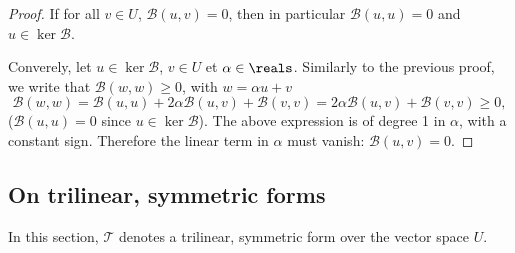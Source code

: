 \begin{proof}
  If for all $v \in U$, $\mathcal{B}(u, v) = 0$, then in particular $\mathcal{B}(u, u) = 0$ and
  $u \in \ker \mathcal{B}$.

  Converely, let $u \in \ker \mathcal{B}$, $v \in U$ et $\alpha \in \reals$. Similarly to the previous proof, we write
  that $\mathcal{B}(w, w) \geq 0$, with $w = \alpha u + v$
  \begin{equation*}
    \mathcal{B}(w, w) = \mathcal{B}(u, u) + 2 \alpha \mathcal{B}(u, v) +\mathcal{B}(v, v) = 2 \alpha \mathcal{B}(u, v) +\mathcal{B}(v, v) \geq 0,
  \end{equation*}
  ($\mathcal{B}(u, u) = 0$ since $u \in \ker \mathcal{B}$). The above expression is of degree 1 in $\alpha$, with a
  constant sign. Therefore the linear term in $\alpha$ must vanish: $\mathcal{B}(u, v) = 0$.
\end{proof}

\subsection{On trilinear, symmetric forms}

In this section, $\mathcal T$ denotes a trilinear, symmetric form over the vector space $U$.

